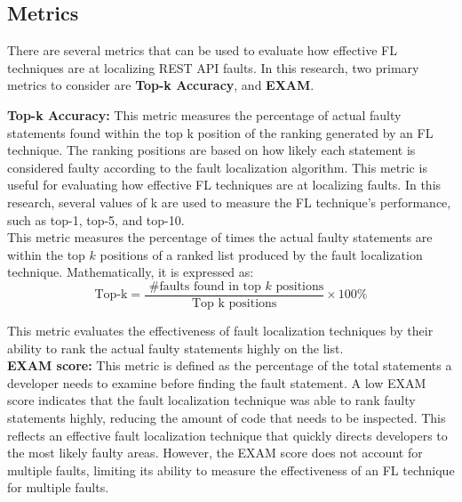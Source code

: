 \documentclass[conference]{IEEEtran}
\begin{document}
\subsection{Metrics}
\label{sec:metrics}

There are several metrics that can be used to evaluate how effective FL techniques are at localizing REST API faults. In this research, two primary metrics to consider are \textbf{Top-k Accuracy}, and \textbf{EXAM}.

\textbf{Top-k Accuracy:} This metric measures the percentage of actual faulty statements found within the top k position of the ranking generated by an FL technique. The ranking positions are based on how likely each statement is considered faulty according to the fault localization algorithm. This metric is useful for evaluating how effective FL techniques are at localizing faults. In this research, several values of k are used to measure the FL technique's performance, such as top-1, top-5, and top-10.
\\
This metric measures the percentage of times the actual faulty statements are within the top $k$ positions of a ranked list produced by the fault localization technique. Mathematically, it is expressed as:
    \[
        \text{Top-k} = \frac{\text{ \#faults found in top } k \text{ positions}}{\text{Top k positions}} \times 100\%
    \]

    This metric evaluates the effectiveness of fault localization techniques by their ability to rank the actual faulty statements highly on the list.
    \\

    \textbf{EXAM score:}  This metric is defined as the percentage of the total statements a developer needs to examine before finding the fault statement. A low EXAM score indicates that the fault localization technique was able to rank faulty statements highly, reducing the amount of code that needs to be inspected. This reflects an effective fault localization technique that quickly directs developers to the most likely faulty areas. However, the EXAM score does not account for multiple faults, limiting its ability to measure the effectiveness of an FL technique for multiple faults.
\end{document}
